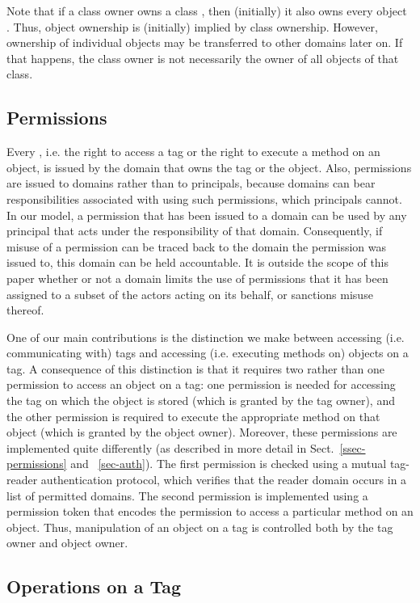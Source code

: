 Note that if a class owner  owns a class , then
(initially) it also owns every object .  Thus, object
ownership is (initially) implied by class ownership.  However, ownership of
individual objects may be transferred to other domains later on. 
If that happens, the class owner is not necessarily the owner of all objects
of that class.

\subsection{Permissions}

Every , i.e. the right to access a tag or the right to execute
a method on an object, is issued by the domain that owns the tag or the
object. Also, permissions are issued to domains rather than to principals,
because domains can bear responsibilities associated with using such
permissions, which principals cannot. In our model, a permission that has been
issued to a domain can be used by any principal that acts under the
responsibility of that domain. Consequently, if misuse of a permission can be
traced back to the domain the permission was issued to, this domain can be held
accountable. 
It is outside the scope of this paper whether or not 
a domain limits the use of permissions that it has been assigned 
to a subset of the actors acting on its behalf, or sanctions misuse thereof.

One of our main contributions is the distinction we make between accessing
(i.e. communicating with) tags and accessing (i.e. executing methods on)
objects on a tag. A consequence of this distinction is that it requires two
rather than one permission to access an object on a tag: one permission is
needed for accessing the tag on which the object is stored (which is granted by
the tag owner), and the other
permission is required to execute the appropriate method on that object (which
is granted by the object owner). 
Moreover, these permissions are implemented quite differently (as described in
more detail in Sect.~\ref{ssec-permissions} and ~\ref{sec-auth}). The first permission
is checked using a mutual tag-reader authentication protocol, which verifies
that the reader domain occurs in a list of permitted domains. The second
permission is implemented using a permission token that encodes the permission
to access a particular method on an object. Thus,
manipulation of an object on a tag is controlled both by the tag owner and
object owner.

\subsection{Operations on a Tag}
\label{ssec-operations}

